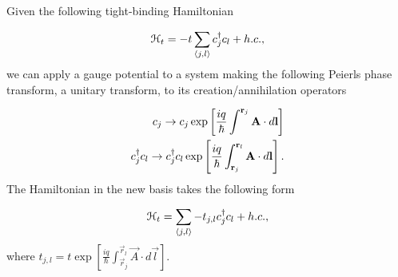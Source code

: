 
Given the following tight-binding Hamiltonian

\begin{equation}
  \mathcal{H}_t = -t \sum_{\langle j, l \rangle} c^{\dagger}_j c_{l} + h.c.,
\end{equation}
we can apply a gauge potential to a system making the following Peierls phase transform, a unitary transform, to its creation/annihilation operators

\begin{align}
  c_j \rightarrow c_j \exp \left[{\frac{iq}{\hbar} \int^{\mathbf{r}_j} \mathbf{A}\cdot d\mathbf{l}} \right] \nonumber \\
  c^{\dagger}_j c_l \rightarrow c^{\dagger}_j c_l \exp \left[{\frac{iq}{\hbar} \int^{\mathbf{r}_l}_{\mathbf{r}_j} \mathbf{A}\cdot d\mathbf{l}} \right].
\end{align}
The Hamiltonian in the new basis takes the following form

\begin{equation}
  \mathcal{H}_t = \sum_{\langle j, l \rangle} -t_{j,l} c^{\dagger}_j c_{l} + h.c.,
\end{equation}
where $t_{j,l} = t \exp \left[{\frac{iq}{\hbar} \int^{\vec{r}_l}_{\vec{r}_j} \vec{A}\cdot d\vec{l}} \right]$.

